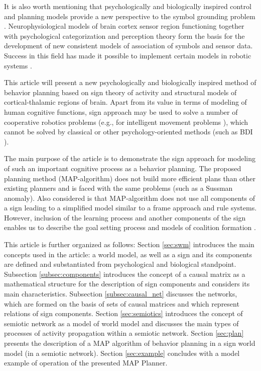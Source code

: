 \documentclass[review]{elsarticle}
\begin{document}
It is also worth mentioning that psychologically and biologically inspired control and planning models provide a new perspective to the symbol grounding problem \cite{Harnad1990,Barsalou1999,Chella2003,Besold2015}. Neurophysiological models of brain cortex sensor region functioning together with psychological categorization and perception theory form the basis for the development of new consistent models of association of symbols and sensor data. Success in this field has made it possible to implement certain models in robotic systems \cite{Heintz2010}. 

This article will present a new psychologically and biologically inspired method of behavior planning based on sign theory of activity and structural models of cortical-thalamic regions of brain. Apart from its value in terms of modeling of human cognitive functions, sign approach may be used to solve a number of cooperative robotics problems (e.g., for intelligent movement problems \cite{Panov2016b,Panov2016c}), which cannot be solved by classical or other psychology-oriented methods (such as BDI \cite{Sardina2006}).

The main purpose of the article is to demonstrate the sign approach for modeling of such an important cognitive process as a behavior planning. The proposed planning method (MAP-algorithm) does not build more efficient plans than other existing planners and is faced with the same problems (such as a Sussman anomaly). Also considered is that MAP-algorithm does not use all components of a sign leading to a simplified model similar to a frame approach and rule systems. However, inclusion of the learning process and another components of the sign enables us to describe the goal setting process and models of coalition formation \cite{Skrynnik2016,Osipov2014c}.

This article is further organized as follows: Section \ref{sec:swm} introduces the main concepts used in the article: a world model, as well as a sign and its components are defined and substantiated from psychological and biological standpoint. Subsection \ref{subsec:components} introduces the concept of a causal matrix as a mathematical structure for the description of sign components and considers its main characteristics. Subsection \ref{subsec:causal_net} discusses the networks, which are formed on the basis of sets of causal matrices and which represent relations of sign components. Section \ref{sec:semiotics} introduces the concept of semiotic network as a model of world model and discusses the main types of processes of activity propagation within a semiotic network. Section \ref{sec:plan} presents the description of a MAP algorithm of behavior planning in a sign world model (in a semiotic network). Section \ref{sec:example} concludes with a model example of operation of the presented MAP Planner.
\end{document}
